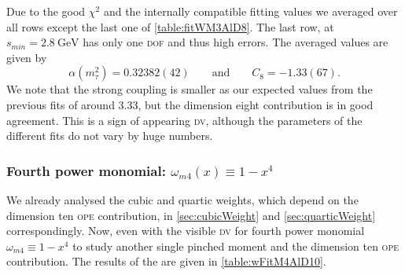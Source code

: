 \documentclass[../../index.tex]{subfiles}
\begin{document}
 Due to the good \(\chi^2\) and the
internally compatible fitting values we averaged over all rows except the last
one of \cref{table:fitWM3AlD8}. The last row, at \(s_{min}=\SI{2.8}{\giga\eV}\)
has only one \textsc{dof} and thus high errors. The averaged values are given by
\begin{equation}
  \alpha(m_\tau^2) = 0.32382(42) \qquad \text{and} \qquad C_8=-1.33(67).
\end{equation}
We note that the strong coupling is smaller as our expected values from the
previous fits of around \(3.33\), but the dimension eight contribution is in
good agreement. This is a sign of appearing \textsc{dv}, although the parameters
of the different fits do not vary by huge numbers.


\subsubsection{Fourth power monomial: \(\omega_{m4}(x) \equiv 1-x^4\)}
We already analysed the cubic and quartic weights, which depend on the dimension
ten \textsc{ope} contribution, in \cref{sec:cubicWeight} and
\cref{sec:quarticWeight} correspondingly. Now, even with the visible \textsc{dv}
for fourth power monomial \(\omega_{m4}\equiv 1-x^4\) to study another single
pinched moment and the dimension ten \textsc{ope} contribution. The results of
the are given in \cref{table:wFitM4AlD10}.
\end{document}
